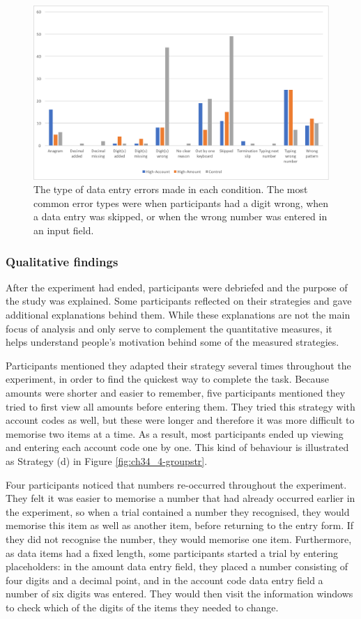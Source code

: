 \begin{figure}
\includegraphics[width=\textwidth]{images/ch34/ch34-4_TypeofErrors.pdf}
    \caption[Study 4 type of data entry errors]{The type of data entry errors made in each condition. The most common error types were when participants had a digit wrong, when a data entry was skipped, or when the wrong number was entered in an input field.}\label{fig:ch34_4-typeoferrors}
\end{figure}

\subsubsection{Qualitative findings}
After the experiment had ended, participants were debriefed and the purpose of the study was explained. Some participants reflected on their strategies and gave additional explanations behind them. While these explanations are not the main focus of analysis and only serve to complement the quantitative measures, it helps understand people's motivation behind some of the measured strategies.

Participants mentioned they adapted their strategy several times throughout the experiment, in order to find the quickest way to complete the task. Because amounts were shorter and easier to remember, five participants mentioned they tried to first view all amounts before entering them. They tried this strategy with account codes as well, but these were longer and therefore it was more difficult to memorise two items at a time. As a result, most participants ended up viewing and entering each account code one by one. This kind of behaviour is illustrated as Strategy (d) in Figure \ref{fig:ch34_4-groupstr}.

Four participants noticed that numbers re-occurred throughout the experiment. They felt it was easier to memorise a number that had already occurred earlier in the experiment, so when a trial contained a number they recognised, they would memorise this item as well as another item, before returning to the entry form. If they did not recognise the number, they would memorise one item. Furthermore, as data items had a fixed length, some participants started a trial by entering placeholders: in the amount data entry field, they placed a number consisting of four digits and a decimal point, and in the account code data entry field a number of six digits was entered. They would then visit the information windows to check which of the digits of the items they needed to change. 

